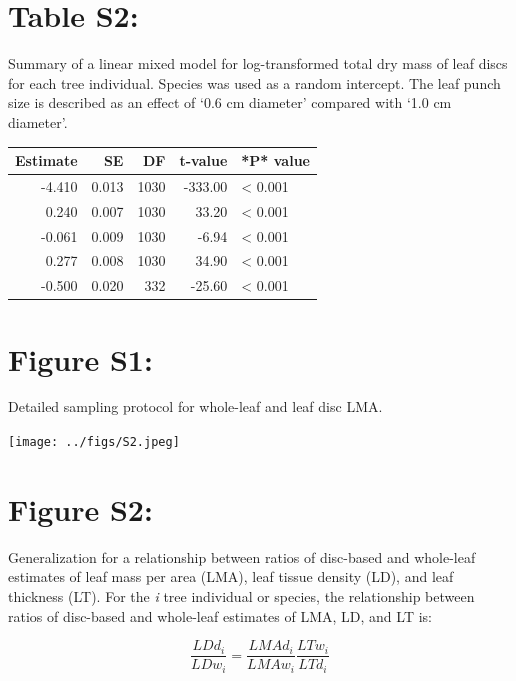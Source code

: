 \documentclass[
  12pt,
  a4paper,
,tablecaptionabove
]{scrartcl}
\begin{document}
\newpage

\hypertarget{table-s2}{%
\section{Table S2:}\label{table-s2}}

Summary of a linear mixed model for log-transformed total dry mass of
leaf discs for each tree individual. Species was used as a random
intercept. The leaf punch size is described as an effect of `0.6 cm
diameter' compared with `1.0 cm diameter'.

\begin{table}
\centering
\begin{tabular}{r|r|r|r|l}
\hline
Estimate & SE & DF & t-value & *P* value\\
\hline
-4.410 & 0.013 & 1030 & -333.00 & < 0.001\\
\hline
0.240 & 0.007 & 1030 & 33.20 & < 0.001\\
\hline
-0.061 & 0.009 & 1030 & -6.94 & < 0.001\\
\hline
0.277 & 0.008 & 1030 & 34.90 & < 0.001\\
\hline
-0.500 & 0.020 & 332 & -25.60 & < 0.001\\
\hline
\end{tabular}
\end{table}

\newpage

\hypertarget{figure-s1}{%
\section{Figure S1:}\label{figure-s1}}

Detailed sampling protocol for whole-leaf and leaf disc LMA.

\texttt{[image: ../figs/S2.jpeg]}

\newpage

\hypertarget{figure-s2}{%
\section{Figure S2:}\label{figure-s2}}

Generalization for a relationship between ratios of disc-based and
whole-leaf estimates of leaf mass per area (LMA), leaf tissue density
(LD), and leaf thickness (LT). For the \emph{i} tree individual or
species, the relationship between ratios of disc-based and whole-leaf
estimates of LMA, LD, and LT is:

\[
\frac{LDd_i}{LDw_i} = \frac{LMAd_i}{LMAw_i} \frac{LTw_i}{LTd_i}
\]
\end{document}

